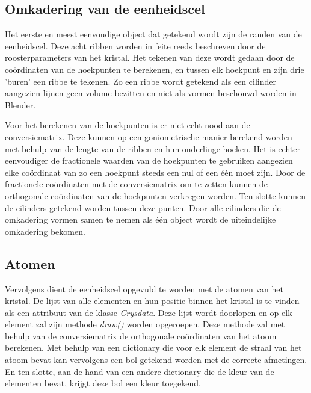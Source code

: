 \subsection{Omkadering van de eenheidscel}
Het eerste en meest eenvoudige object dat getekend wordt zijn de randen van de eenheidscel. Deze acht ribben worden in feite reeds beschreven door de roosterparameters van het kristal. Het tekenen van deze wordt gedaan door de coördinaten van de hoekpunten te berekenen, en tussen elk hoekpunt en zijn drie 'buren' een ribbe te tekenen. Zo een ribbe wordt getekend als een cilinder aangezien lijnen geen volume bezitten en niet als vormen beschouwd worden in Blender. 
\par
Voor het berekenen van de hoekpunten is er niet echt nood aan de conversiematrix. Deze kunnen op een goniometrische manier berekend worden met behulp van de lengte van de ribben en hun onderlinge hoeken. Het is echter eenvoudiger de fractionele waarden van de hoekpunten te gebruiken aangezien elke coördinaat van zo een hoekpunt steeds een nul of een één moet zijn. Door de fractionele coördinaten met de conversiematrix om te zetten kunnen de orthogonale coördinaten van de hoekpunten verkregen worden. Ten slotte kunnen de cilinders getekend worden tussen deze punten. Door alle cilinders die de omkadering vormen samen te nemen als één object wordt de uiteindelijke omkadering bekomen.
\par
\subsection{Atomen}
Vervolgens dient de eenheidscel opgevuld te worden met de atomen van het kristal. De lijst van alle elementen en hun positie binnen het kristal is te vinden als een attribuut van de klasse \textit{Crysdata}. Deze lijst wordt doorlopen en op elk element zal zijn methode \textit{draw()} worden opgeroepen. Deze methode zal met behulp van de conversiematrix de orthogonale coördinaten van het atoom berekenen. Met behulp van een dictionary die voor elk element de straal van het atoom bevat kan vervolgens een bol getekend worden met de correcte afmetingen. En ten slotte, aan de hand van een andere dictionary die de kleur van de elementen bevat, krijgt deze bol een kleur toegekend. 
\par
